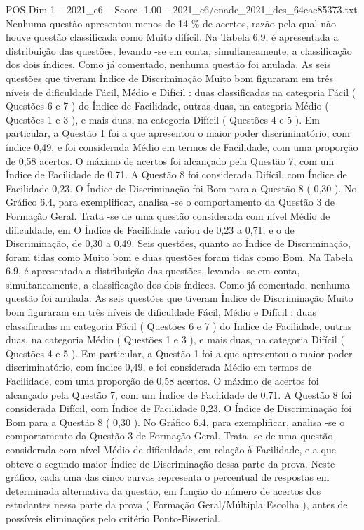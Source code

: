 \begin{textsample}{POS Dim 1 – 2021\_c6 – Score -1.00 – 2021\_c6/enade\_2021\_des\_64eae85373.txt}
Nenhuma questão apresentou menos de 14 \% de acertos, razão pela qual não houve questão classificada como Muito difícil.
Na Tabela 6.9, é apresentada a distribuição das questões, levando -se em conta, simultaneamente, a classificação dos dois índices.
Como já comentado, nenhuma questão foi anulada.
As seis questões que tiveram Índice de Discriminação Muito bom figuraram em três níveis de dificuldade Fácil, Médio e Difícil : duas classificadas na categoria Fácil ( Questões 6 e 7 ) do Índice de Facilidade, outras duas, na categoria Médio ( Questões 1 e 3 ), e mais duas, na categoria Difícil ( Questões 4 e 5 ).
Em particular, a Questão 1 foi a que apresentou o maior poder discriminatório, com índice 0,49, e foi considerada Médio em termos de Facilidade, com uma proporção de 0,58 acertos.
O máximo de acertos foi alcançado pela Questão 7, com um Índice de Facilidade de 0,71.
A Questão 8 foi considerada Difícil, com Índice de Facilidade 0,23.
O Índice de Discriminação foi Bom para a Questão 8 ( 0,30 ).
No Gráfico 6.4, para exemplificar, analisa -se o comportamento da Questão 3 de Formação Geral.
Trata -se de uma questão considerada com nível Médio de dificuldade, em O Índice de Facilidade variou de 0,23 a 0,71, e o de Discriminação, de 0,30 a 0,49.
Seis questões, quanto ao Índice de Discriminação, foram tidas como Muito bom e duas questões foram tidas como Bom.
Na Tabela 6.9, é apresentada a distribuição das questões, levando -se em conta, simultaneamente, a classificação dos dois índices.
Como já comentado, nenhuma questão foi anulada.
As seis questões que tiveram Índice de Discriminação Muito bom figuraram em três níveis de dificuldade Fácil, Médio e Difícil : duas classificadas na categoria Fácil ( Questões 6 e 7 ) do Índice de Facilidade, outras duas, na categoria Médio ( Questões 1 e 3 ), e mais duas, na categoria Difícil ( Questões 4 e 5 ).
Em particular, a Questão 1 foi a que apresentou o maior poder discriminatório, com índice 0,49, e foi considerada Médio em termos de Facilidade, com uma proporção de 0,58 acertos.
O máximo de acertos foi alcançado pela Questão 7, com um Índice de Facilidade de 0,71.
A Questão 8 foi considerada Difícil, com Índice de Facilidade 0,23.
O Índice de Discriminação foi Bom para a Questão 8 ( 0,30 ).
No Gráfico 6.4, para exemplificar, analisa -se o comportamento da Questão 3 de Formação Geral.
Trata -se de uma questão considerada com nível Médio de dificuldade, em relação à Facilidade, e a que obteve o segundo maior Índice de Discriminação dessa parte da prova.
Neste gráfico, cada uma das cinco curvas representa o percentual de respostas em determinada alternativa da questão, em função do número de acertos dos estudantes nessa parte da prova ( Formação Geral/Múltipla Escolha ), antes de possíveis eliminações pelo critério Ponto-Bisserial.

\end{textsample}
